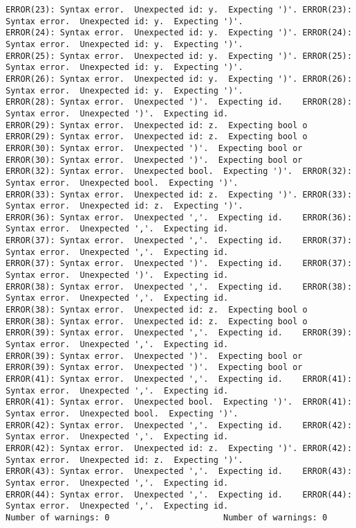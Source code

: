 \documentclass[12pt]{book}
\begin{document}
\begin{lstlisting}
ERROR(23): Syntax error.  Unexpected id: y.  Expecting ')'.	ERROR(23): Syntax error.  Unexpected id: y.  Expecting ')'.
ERROR(24): Syntax error.  Unexpected id: y.  Expecting ')'.	ERROR(24): Syntax error.  Unexpected id: y.  Expecting ')'.
ERROR(25): Syntax error.  Unexpected id: y.  Expecting ')'.	ERROR(25): Syntax error.  Unexpected id: y.  Expecting ')'.
ERROR(26): Syntax error.  Unexpected id: y.  Expecting ')'.	ERROR(26): Syntax error.  Unexpected id: y.  Expecting ')'.
ERROR(28): Syntax error.  Unexpected ')'.  Expecting id.	ERROR(28): Syntax error.  Unexpected ')'.  Expecting id.
ERROR(29): Syntax error.  Unexpected id: z.  Expecting bool o	ERROR(29): Syntax error.  Unexpected id: z.  Expecting bool o
ERROR(30): Syntax error.  Unexpected ')'.  Expecting bool or 	ERROR(30): Syntax error.  Unexpected ')'.  Expecting bool or 
ERROR(32): Syntax error.  Unexpected bool.  Expecting ')'.	ERROR(32): Syntax error.  Unexpected bool.  Expecting ')'.
ERROR(33): Syntax error.  Unexpected id: z.  Expecting ')'.	ERROR(33): Syntax error.  Unexpected id: z.  Expecting ')'.
ERROR(36): Syntax error.  Unexpected ','.  Expecting id.	ERROR(36): Syntax error.  Unexpected ','.  Expecting id.
ERROR(37): Syntax error.  Unexpected ','.  Expecting id.	ERROR(37): Syntax error.  Unexpected ','.  Expecting id.
ERROR(37): Syntax error.  Unexpected ')'.  Expecting id.	ERROR(37): Syntax error.  Unexpected ')'.  Expecting id.
ERROR(38): Syntax error.  Unexpected ','.  Expecting id.	ERROR(38): Syntax error.  Unexpected ','.  Expecting id.
ERROR(38): Syntax error.  Unexpected id: z.  Expecting bool o	ERROR(38): Syntax error.  Unexpected id: z.  Expecting bool o
ERROR(39): Syntax error.  Unexpected ','.  Expecting id.	ERROR(39): Syntax error.  Unexpected ','.  Expecting id.
ERROR(39): Syntax error.  Unexpected ')'.  Expecting bool or 	ERROR(39): Syntax error.  Unexpected ')'.  Expecting bool or 
ERROR(41): Syntax error.  Unexpected ','.  Expecting id.	ERROR(41): Syntax error.  Unexpected ','.  Expecting id.
ERROR(41): Syntax error.  Unexpected bool.  Expecting ')'.	ERROR(41): Syntax error.  Unexpected bool.  Expecting ')'.
ERROR(42): Syntax error.  Unexpected ','.  Expecting id.	ERROR(42): Syntax error.  Unexpected ','.  Expecting id.
ERROR(42): Syntax error.  Unexpected id: z.  Expecting ')'.	ERROR(42): Syntax error.  Unexpected id: z.  Expecting ')'.
ERROR(43): Syntax error.  Unexpected ','.  Expecting id.	ERROR(43): Syntax error.  Unexpected ','.  Expecting id.
ERROR(44): Syntax error.  Unexpected ','.  Expecting id.	ERROR(44): Syntax error.  Unexpected ','.  Expecting id.
Number of warnings: 0						Number of warnings: 0

\end{lstlisting}
\end{document}

